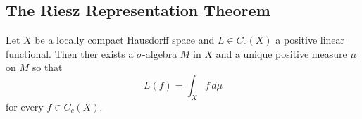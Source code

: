 \subsection{The Riesz Representation Theorem}

\begin{theorem}\label{thm:riesz_representation}
    Let \( X \) be a locally compact Hausdorff space and \( L \in C_c(X) \) a positive linear functional. 
    Then ther exists a \( \sigma \)-algebra \( M \) in \( X \) and a unique positive measure 
    \( \mu \) on \( M \) so that
    \[
        L(f) = \int_X f\,d\mu
    \]
    for every \( f \in C_c(X) \).
\end{theorem}
\bigskip
